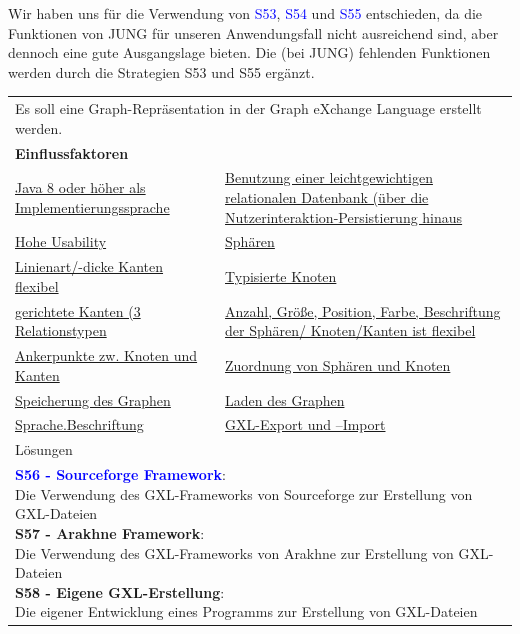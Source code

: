 \documentclass[enabledeprecatedfontcommands,fontsize=11pt,paper=a4,twoside]{scrartcl}
\newcounter{one}
\newcommand{\cb}[1]{{\textcolor{blue}{#1}}}
\begin{document}
\begin{onehalfspace}
	Wir haben uns für die Verwendung von \cb{S53}, \cb{S54} und \cb{S55} entschieden, da die Funktionen von JUNG für unseren Anwendungsfall nicht ausreichend sind, aber dennoch eine gute Ausgangslage bieten. Die (bei JUNG) fehlenden Funktionen werden durch die Strategien S53 und S55 ergänzt.
\end{onehalfspace}



\newpage
\hspace{-0.65cm}
\begin{tabular} {|p{8cm} p{8cm}|}
	\hline
	\rowcolor{prob}\multicolumn{2}{|l|}{\parbox{16cm}{\textbf{22: GXL Erstellung}}} \\  \hline\hline 
	\multicolumn{2}{|l|}{\parbox{16cm}{Es soll eine Graph-Repräsentation in der Graph eXchange Language erstellt werden.}}\rule{0pt}{1ex}\\ [1ex] \hline
	\multicolumn{2}{|l|}{\textbf{Einflussfaktoren}}\\
	\hyperlink{b}{Java 8 oder höher als Implementierungssprache}  & 
	\hyperlink {e}{Benutzung einer leichtgewichtigen relationalen Datenbank (über die Nutzerinteraktion-Persistierung hinaus}\\ 
	\hyperlink {g}{Hohe Usability}&
	\hyperlink {n}{Sphären} \\
	\hyperlink {o}{Linienart/-dicke Kanten flexibel}&
	\hyperlink {p}{Typisierte Knoten} \\
	\hyperlink {q}{gerichtete Kanten (3 Relationstypen} &
	\hyperlink {r}{Anzahl, Größe, Position, Farbe, Beschriftung der Sphären/ Knoten/Kanten ist flexibel} \\
	\hyperlink {s}{Ankerpunkte zw. Knoten und Kanten} &
	\hyperlink {t}{Zuordnung von Sphären und Knoten} \\
	\hyperlink {v}{Speicherung des Graphen} &
	\hyperlink {w}{Laden des Graphen} \\
	\hyperlink {hh}{Sprache.Beschriftung}&
	\hyperlink {jj}{GXL-Export und –Import}
	\\ \hline
	\multicolumn{2}{|l|}{Lösungen} \\
	\multicolumn{2}{|l|}{\parbox{16cm}{
			\textbf{\cb{\hypertarget{ttt}{S56 - Sourceforge Framework}}}: \\
			Die Verwendung des GXL-Frameworks von Sourceforge zur Erstellung von GXL-Dateien \\
			\textbf{S57 - Arakhne Framework}: \\
			Die Verwendung des GXL-Frameworks von Arakhne zur Erstellung von GXL-Dateien \\
			\textbf{S58 - Eigene GXL-Erstellung}: \\
			Die eigener Entwicklung eines Programms zur Erstellung von GXL-Dateien 
	} }\\ [6ex] \hline
\end{tabular}\\ \\ \\
\end{document}
